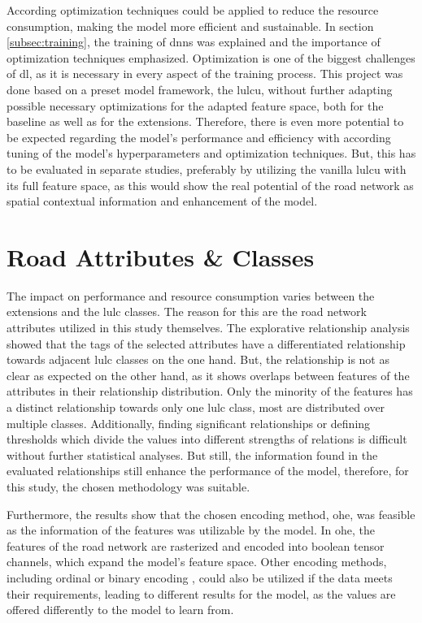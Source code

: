 According optimization techniques could be applied to reduce the resource consumption, making the model more efficient and sustainable. In section \ref{subsec:training}, the training of \glspl{dnn} was explained and the importance of optimization techniques emphasized. Optimization is one of the biggest challenges of \gls{dl}, as it is necessary in every aspect of the training process. This project was done based on a preset model framework, the \gls{lulcu}, without further adapting possible necessary optimizations for the adapted feature space, both for the baseline as well as for the extensions. Therefore, there is even more potential to be expected regarding the model's performance and efficiency with according tuning of the model's hyperparameters and optimization techniques. But, this has to be evaluated in separate studies, preferably by utilizing the vanilla \gls{lulcu} with its full feature space, as this would show the real potential of the road network as spatial contextual information and enhancement of the model.

\section{Road Attributes \&  Classes}

The impact on performance and resource consumption varies between the extensions and the \gls{lulc} classes. The reason for this are the road network attributes utilized in this study themselves. The explorative relationship analysis showed that the tags of the selected attributes have a differentiated relationship towards adjacent \gls{lulc} classes on the one hand. But, the relationship is not as clear as expected on the other hand, as it shows overlaps between features of the attributes in their relationship distribution. Only the minority of the features has a distinct relationship towards only one \gls{lulc} class, most are distributed over multiple classes. Additionally, finding significant relationships or defining thresholds which divide the values into different strengths of relations is difficult without further statistical analyses. But still, the information found in the evaluated relationships still enhance the performance of the model, therefore, for this study, the chosen methodology was suitable.

Furthermore, the results show that the chosen encoding method, \gls{ohe}, was feasible as the information of the features was utilizable by the model. In \gls{ohe}, the features of the road network are rasterized and encoded into boolean tensor channels, which expand the model's feature space. Other encoding methods, including ordinal or binary encoding \autocite{Potdar.Pardawala.ea2017}, could also be utilized if the data meets their requirements, leading to different results for the model, as the values are offered differently to the model to learn from.

